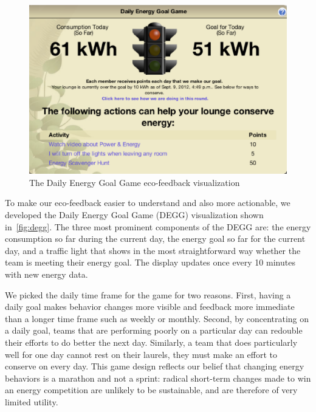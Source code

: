 \documentclass{sigchi}
\begin{document}
\begin{figure}[!tb]
	\centering
	\includegraphics[width=0.95\columnwidth]{degg.eps}
	\caption{The Daily Energy Goal Game eco-feedback visualization}
	\label{fig:degg}
\end{figure}

To make our eco-feedback easier to understand and also more actionable, we developed the Daily Energy Goal Game (DEGG) visualization shown in~\autoref{fig:degg}. The three most prominent components of the DEGG are: the energy consumption so far during the current day, the energy goal so far for the current day, and a traffic light that shows in the most straightforward way whether the team is meeting their energy goal. The display updates once every 10 minutes with new energy data.

We picked the daily time frame for the game for two reasons. First, having a daily goal makes behavior changes more visible and feedback more immediate than a longer time frame such as weekly or monthly. Second, by concentrating on a daily goal, teams that are performing poorly on a particular day can redouble their efforts to do better the next day. Similarly, a team that does particularly well for one day cannot rest on their laurels, they must make an effort to conserve on every day. This game design reflects our belief that changing energy behaviors is a marathon and not a sprint: radical short-term changes made to win an energy competition are unlikely to be sustainable, and are therefore of very limited utility.
\end{document}

